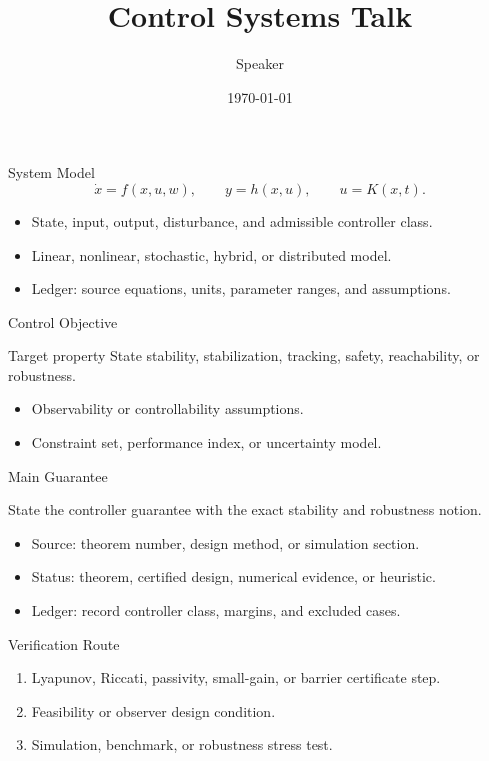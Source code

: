\documentclass[10pt,aspectratio=169]{beamer}
\title{Control Systems Talk}
\author{Speaker}
\date{\today}
\begin{document}
\begin{frame}\titlepage\end{frame}

\begin{frame}{System Model}
  \[
    \dot{x}=f(x,u,w), \qquad y=h(x,u), \qquad u=K(x,t).
  \]
  \begin{itemize}
    \item State, input, output, disturbance, and admissible controller class.
    \item Linear, nonlinear, stochastic, hybrid, or distributed model.
    \item Ledger: source equations, units, parameter ranges, and assumptions.
  \end{itemize}
\end{frame}

\begin{frame}{Control Objective}
  \begin{block}{Target property}
    State stability, stabilization, tracking, safety, reachability, or robustness.
  \end{block}
  \begin{itemize}
    \item Observability or controllability assumptions.
    \item Constraint set, performance index, or uncertainty model.
  \end{itemize}
\end{frame}

\begin{frame}{Main Guarantee}
  \begin{theorem}
    State the controller guarantee with the exact stability and robustness notion.
  \end{theorem}
  \begin{itemize}
    \item Source: theorem number, design method, or simulation section.
    \item Status: theorem, certified design, numerical evidence, or heuristic.
    \item Ledger: record controller class, margins, and excluded cases.
  \end{itemize}
\end{frame}

\begin{frame}{Verification Route}
  \begin{enumerate}
    \item Lyapunov, Riccati, passivity, small-gain, or barrier certificate step.
    \item Feasibility or observer design condition.
    \item Simulation, benchmark, or robustness stress test.
  \end{enumerate}
\end{frame}
\end{document}
